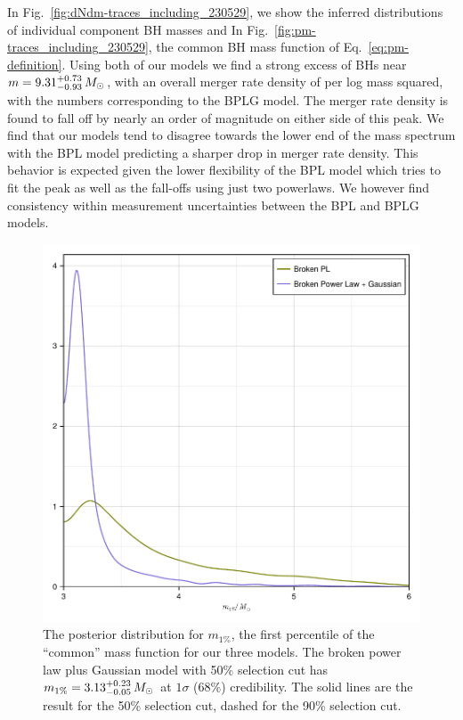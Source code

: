 \documentclass[modern]{aastex631}
\begin{document}
In Fig.~\ref{fig:dNdm-traces_including_230529}, we show the inferred
distributions of individual component BH masses and In
Fig.~\ref{fig:pm-traces_including_230529}, the common BH mass function of
Eq.~\eqref{eq:pm-definition}. Using both of our models we find a strong excess
of BHs near $m=9.31^{+0.73}_{-0.93} \, M_\odot$, with an overall merger rate density of
\dNlogmpeakincludingnewunits per log mass squared, with the numbers corresponding to the BPLG model. \chcomment[id=W]{}
\chcomment[id=W]{} The merger rate density is found to fall off by nearly an order of
magnitude on either side of this peak. We find that our models tend to disagree
towards the lower end of the mass spectrum with the BPL model predicting a
sharper drop in merger rate density. This behavior is expected given the lower
flexibility of the BPL model which tries to fit the peak as well as the
fall-offs using just two powerlaws. We however find consistency within
measurement uncertainties between the BPL and BPLG models.

\begin{figure}
    \includegraphics[width=\columnwidth]{figures/m1pct_including_230529.pdf}
    \caption{\label{fig:m1pct_including_230529} The posterior distribution for $m_{1\%}$, the
    first percentile of the ``common'' mass function for our three models.  The
    broken power law plus Gaussian model with 50\% selection cut has $m_{1\%} =
    3.13^{+0.23}_{-0.05} \, M_\odot$ at $1\sigma$ (68\%) credibility.  The solid lines are
    the result for the 50\% selection cut, dashed for the 90\% selection cut.}
\end{figure}
\end{document}
